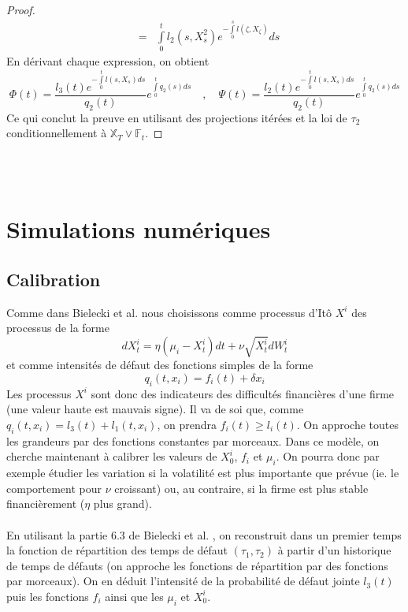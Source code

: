 \documentclass[a4paper]{article}
\theoremstyle{definition}
\theoremstyle{remark}
\begin{document}
\begin{proof}
\begin{eqnarray*}
&=& \int \limits_0^t l_2 (s, X^2_s) e^{-\int \limits_0^s l(\zeta, X_\zeta)} ds
\end{eqnarray*}
En dérivant chaque expression, on obtient
\begin{equation*}
\Phi (t) = \frac{l_3(t) e^{-\int \limits_0^t l(s, X_s)ds}}{q_2(t)}e^{\int \limits_0^t q_2 (s) ds} \quad , \quad 
\Psi(t) =  \frac{l_2(t) e^{-\int \limits_0^t l(s, X_s)ds}}{q_2(t)}e^{\int \limits_0^t q_2 (s) ds}
\end{equation*}
Ce qui conclut la preuve en utilisant des projections itérées et la loi de $\tau_2$ conditionnellement à $\mathbb{X}_T \vee \mathbb{F}_t$.
\end{proof}
~~\\\\
\section{Simulations numériques}
\subsection{Calibration}
Comme dans Bielecki et al. \cite{A} nous choisissons comme processus d'Itô $X^i$ des processus de la forme
\begin{equation*}
dX^i_t = \eta (\mu_i - X^i_t)dt + \nu \sqrt{X^i_t}dW^i_t
\end{equation*}
et comme intensités de défaut des fonctions simples de la forme
\begin{equation*}
q_i(t,x_i) = f_i(t) + \delta x_i
\end{equation*}
Les processus $X^i$ sont donc des indicateurs des difficultés financières d'une firme (une valeur haute est mauvais signe). Il va de soi que, comme $q_i(t,x_i) = l_3 (t) + l_1 (t, x_i)$, on prendra $f_i(t) \geq l_i(t)$. On approche toutes les grandeurs par des fonctions constantes par morceaux. Dans ce modèle, on cherche maintenant à calibrer les valeurs de $X_0^i$, $f_i$ et $\mu_i$. On pourra donc par exemple étudier les variation si la volatilité est plus importante que prévue (ie. le comportement pour $\nu$ croissant) ou, au contraire, si la firme est plus stable financièrement ($\eta$ plus grand). \\ \\
En utilisant la partie 6.3 de Bielecki et al. \cite{A}, on reconstruit dans un premier temps la fonction de répartition des temps de défaut $(\tau_1, \tau_2)$ à partir d'un historique de temps de défauts (on approche les fonctions de répartition par des fonctions par morceaux). On en déduit l'intensité de la probabilité de défaut jointe $l_3(t)$ puis les fonctions $f_i$ ainsi que les $\mu_i$ et $X^i_0$.
\end{document}
